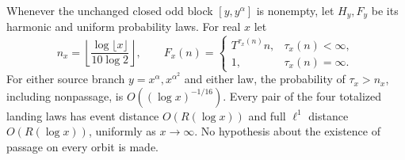 \begin{theorem}
\label{thm:Mazur-real-passage}
Whenever the unchanged closed odd block \([y,y^\alpha]\) is nonempty,
let \(H_y,F_y\) be its harmonic and uniform probability laws.
For real \(x\) let
\[
 n_x=\left\lfloor\frac{\log\lfloor x\rfloor}{10\log2}\right\rfloor,
 \qquad
 F_x(n)=
 \begin{cases}T^{\tau_x(n)}n,&\tau_x(n)<\infty,\\1,&\tau_x(n)=\infty.
 \end{cases}
\]
For either source branch \(y=x^\alpha,x^{\alpha^2}\) and either law,
the probability of \(\tau_x>n_x\), including nonpassage, is
\(O((\log x)^{-1/16})\). Every pair of the four totalized landing
laws has event distance \(O(R(\log x))\) and full \(\ell^1\)
distance \(O(R(\log x))\), uniformly as \(x\to\infty\).
No hypothesis about the existence of passage on every orbit is made.
\end{theorem}

